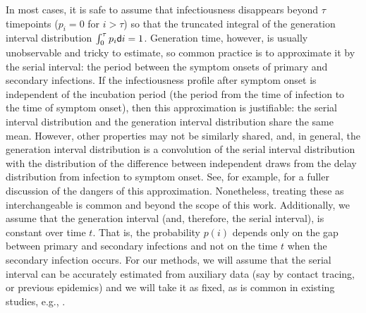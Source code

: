 In most cases, it is safe to assume that
infectiousness disappears beyond $\tau$ timepoints ($p_i = 0$ for $i > \tau$)
so that the truncated integral of the generation interval distribution
$\int_0^\tau p_i\mathsf{d} i = 1$.
Generation time, however, is usually unobservable and tricky to estimate, so
common practice is to approximate it by the serial interval: the period between
the symptom onsets of primary and secondary infections. If the infectiousness
profile after symptom onset is independent of the incubation period (the period
from the time of infection to the time of symptom onset), then this
approximation is justifiable: the serial interval distribution and the
generation interval distribution share the same mean. However, other properties
may not be similarly shared, and, in general, the generation interval
distribution is a convolution of the serial interval distribution with the
distribution of the difference between independent draws from the delay
distribution from infection to symptom onset. See, for example,
\citet{gostic2020practical} for a fuller discussion of the dangers of this
approximation. Nonetheless, treating these as interchangeable is common
\citep{cori2013new} and beyond the scope of this work. Additionally, we assume
that the generation interval (and, therefore, the serial interval), is constant over time
$t$. That is, the probability $p(i)$ depends only on the gap between primary and
secondary infections and not on the time $t$ when the secondary infection
occurs. For our methods, we will assume that the serial interval can be
accurately estimated from auxiliary data (say by contact tracing, or previous
epidemics) and we will take it as fixed, as is common in existing studies, e.g.,
\cite{cori2013new,abry2020spatial,pascal2022nonsmooth}.

